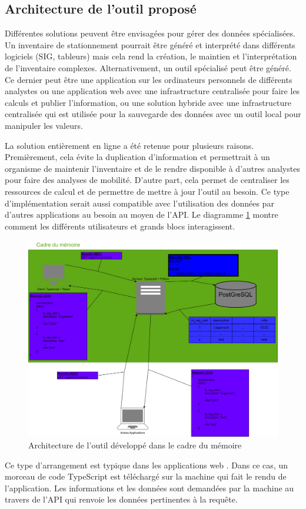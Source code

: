 \subsection{Architecture de l'outil proposé}
Différentes solutions peuvent être envisagées pour gérer des données spécialisées. Un inventaire de stationnement pourrait être généré et interprété dans différents logiciels (SIG, tableurs) mais cela rend la création, le maintien et l'interprétation de l'inventaire complexes. Alternativement, un outil spécialisé peut être généré. Ce dernier peut être une application sur les ordinateurs personnels de différents analystes ou une application web avec une infrastructure centralisée pour faire les calculs et publier l'information, ou une solution hybride avec une infrastructure centralisée qui est utilisée pour la sauvegarde des données avec un outil local pour manipuler les valeurs. \par
La solution entièrement en ligne a été retenue pour plusieurs raisons. Premièrement, cela évite la duplication d'information et permettrait à un organisme de maintenir l'inventaire et de le rendre disponible à d'autres analystes pour faire des analyses de mobilité. D'autre part, cela permet de centraliser les ressources de calcul et de permettre de mettre à jour l'outil au besoin. Ce type d'implémentation serait aussi compatible avec l'utilisation des données par d'autres applications au besoin au moyen de l'\ac{API}. Le diagramme \ref{fig:architecture_outil} montre comment les différents utilisateurs et grands blocs interagissent.\par
\begin{figure}[h]
    \centering
    \includegraphics[width=1.0\linewidth]{dia/Architecture_outil.png}
    \caption{Architecture de l'outil développé dans le cadre du mémoire}
    \label{fig:architecture_outil}
\end{figure}
Ce type d'arrangement est typique dans les applications web \cite{chernenko_full_2024}. Dans ce cas, un morceau de code TypeScript est téléchargé sur la machine  \fg{} qui fait le rendu de l'application. Les informations et les données sont demandées par la machine  \fg{} au travers de l'API qui renvoie les données pertinentes à la requête. 
